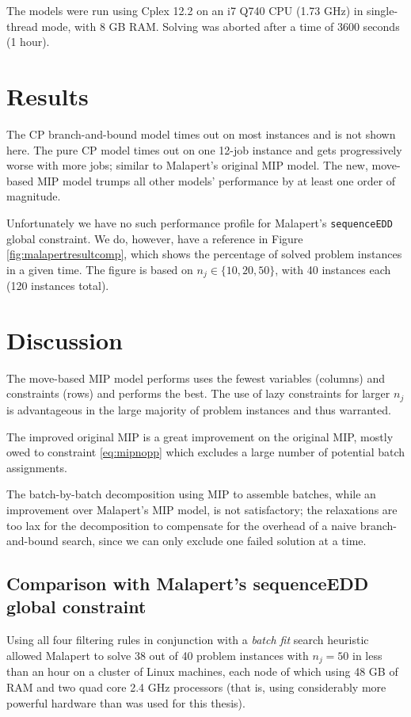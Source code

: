 \documentclass[13pt, letterpaper, oneside]{book}
\begin{document}
The models were run using Cplex 12.2 on an i7 Q740 CPU (1.73 GHz) in single-thread mode, with 8 GB RAM.
Solving was aborted after a time of 3600 seconds (1 hour).

\section{Results}
The CP branch-and-bound model times out on most instances and is not shown here.
The pure CP model times out on one 12-job instance and gets progressively worse
with more jobs; similar to Malapert's original MIP model.
 The new, move-based MIP model trumps all other
models' performance by at least one order of magnitude.

Unfortunately we have no such performance profile for Malapert's
\texttt{sequenceEDD} global constraint. We do, however, have a reference in
Figure \ref{fig:malapertresultcomp}, which shows the percentage of solved
problem instances in a given time. The figure is based on $n_j \in \{10, 20,
50\}$, with 40 instances each (120 instances total).


\section{Discussion}\label{sec:discussion}
The move-based MIP model performs uses the fewest variables (columns) and
constraints (rows) and performs the best. The use of lazy constraints for
larger $n_j$ is advantageous in the large majority of problem instances and thus
warranted. 

The improved original MIP is a great improvement on the original MIP, mostly
owed to constraint \eqref{eq:mipnopp} which excludes a large number of potential
batch assignments.

The batch-by-batch decomposition using MIP to assemble batches, while an
improvement over Malapert's MIP model, is not satisfactory; the relaxations are
too lax for the decomposition to compensate for the overhead of a naive
branch-and-bound search, since we can only exclude one failed solution at a
time.

\subsection{Comparison with Malapert's sequenceEDD global constraint}
Using all four filtering rules in conjunction with a \textit{batch fit} search
heuristic allowed Malapert to solve 38 out of 40 problem instances with $n_j =
50$ in less than an hour on a cluster of Linux machines, each node of which
using 48 GB of RAM and two quad core 2.4 GHz processors (that is, using
considerably more powerful hardware than was used for this thesis). 
\end{document}
